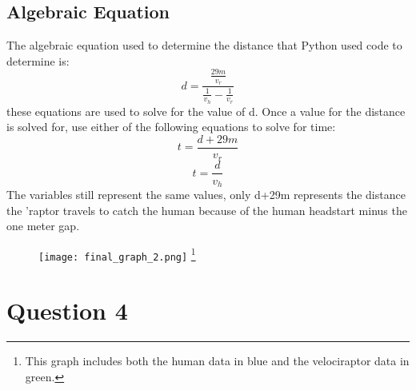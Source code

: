 \documentclass[twocolumn]{revtex4}
\begin{document}
\subsection{Algebraic Equation}
The algebraic equation used to determine the distance that Python used code to determine is:
$$d=\frac{\frac{29m}{v_r}}{{\frac{1}{v_h}}-{\frac{1}{v_r}}}$$
these equations are used to solve for the value of d. Once a value for the distance is solved for, use either of the following equations to solve for time:
$$ t = \frac{d+29m}{v_r} $$ $$t = \frac{d}{v_h} $$
The variables still represent the same values, only d+29m represents the distance the 'raptor travels to catch the human because of the human headstart minus the one meter gap.
\begin{figure}[h]
\centering
    \texttt{[image: final\_graph\_2.png]}
\footnote{This graph includes both the human data in blue and the velociraptor data in green.\label{fig:final_graph_2.png}}
\end{figure}

\section{Question 4}
\end{document}
